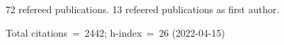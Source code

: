 72 refereed publications. 13 refeered publications as first author.

Total citations~=~2442; h-index~=~26 (2022-04-15)